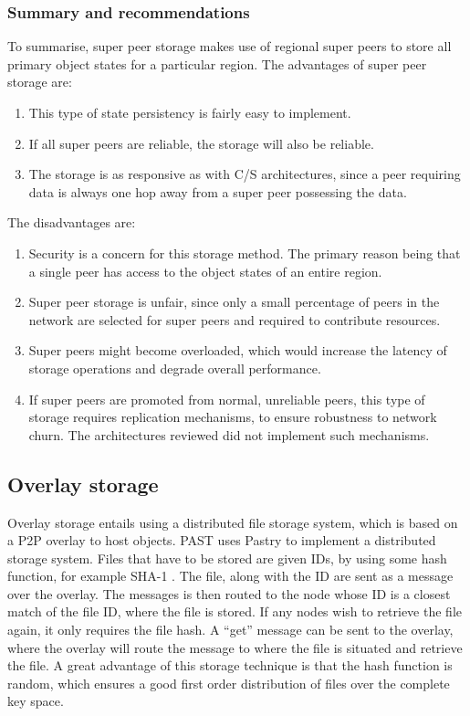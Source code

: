 \documentclass[10pt,a4paper,journal,cspaper,compsoc]{IEEEtran}
\begin{document}
\subsubsection{Summary and recommendations}

To summarise, super peer storage makes use of regional super peers to store all primary object states for a particular region. The advantages of
super peer storage are:
%
\begin{enumerate}
    \item This type of state persistency is fairly easy to implement.
    \item If all super peers are reliable, the storage will also be reliable.
    \item The storage is as responsive as with C/S architectures, since a peer requiring data is always one hop away from a super peer possessing
        the data.
\end{enumerate}

The disadvantages are:
%
\begin{enumerate}
    \item Security is a concern for this storage method. The primary reason being that a single peer has access to the object states of an entire
        region.
    \item Super peer storage is unfair, since only a small percentage of peers in the network are selected for super peers and required to
        contribute resources.
    \item Super peers might become overloaded, which would increase the latency of storage operations and degrade overall performance.
    \item If super peers are promoted from normal, unreliable peers, this type of storage requires replication mechanisms, to ensure robustness
        to network churn. The architectures reviewed did not implement such mechanisms.
\end{enumerate}

\subsection{Overlay storage}
\label{overlay_storage}

Overlay storage entails using a distributed file storage system, which is based on a P2P overlay to host objects. PAST \cite{PAST_storage} uses
Pastry to implement a distributed storage system. Files that have to be stored are given IDs, by using some hash function, for example SHA-1
\cite{SHA}. The file, along with the ID are sent as a message over the overlay. The messages is then routed to the node whose ID is a closest match
of the file ID, where the file is stored. If any nodes wish to retrieve the file again, it only requires the file hash. A ``get'' message can be sent
to the overlay, where the overlay will route the message to where the file is situated and retrieve the file. A great advantage of this storage
technique is that the hash function is random, which ensures a good first order distribution of files over the complete key space.
\end{document}
